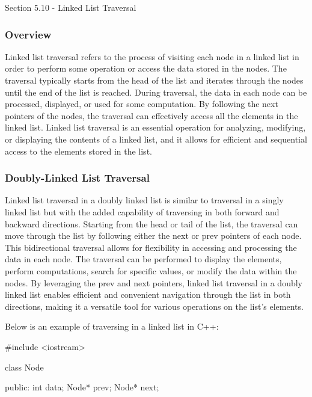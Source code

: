 \begin{notes}{Section 5.10 - Linked List Traversal}
    \subsubsection*{Overview}

    Linked list traversal refers to the process of visiting each node in a linked list in order to perform some operation or access the data stored in the nodes. The traversal typically starts from the head of the list and iterates through the nodes until the end of the list is reached. During traversal, the data in each node can be 
    processed, displayed, or used for some computation. By following the next pointers of the nodes, the traversal can effectively access all the elements in the linked list. Linked list traversal is an essential operation for analyzing, modifying, or displaying the contents of a linked list, and it allows for efficient and sequential 
    access to the elements stored in the list.
    
    \subsubsection*{Doubly-Linked List Traversal}
    
    Linked list traversal in a doubly linked list is similar to traversal in a singly linked list but with the added capability of traversing in both forward and backward directions. Starting from the head or tail of the list, the traversal can move through the list by following either the next or prev pointers of each node. This bidirectional 
    traversal allows for flexibility in accessing and processing the data in each node. The traversal can be performed to display the elements, perform computations, search for specific values, or modify the data within the nodes. By leveraging the prev and next pointers, linked list traversal in a doubly linked list enables efficient and convenient 
    navigation through the list in both directions, making it a versatile tool for various operations on the list's elements.
    
    \begin{highlight}
        Below is an example of traversing in a linked list in C++:
    
        \begin{code}[C++]
        #include <iostream>
    
        class Node {
        public:
            int data;
            Node* prev;
            Node* next;
        
}
\end{code}
\end{highlight}
\end{notes}
